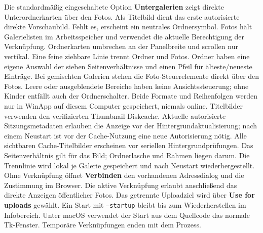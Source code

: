 \documentclass[11pt,a4paper]{article}
\newcommand{\ui}[1]{\textbf{#1}}
\begin{document}
Die standardmäßig eingeschaltete Option \ui{Untergalerien} zeigt direkte
Unterordnerkarten über den Fotos. Als Titelbild dient das erste autorisierte
direkte Vorschaubild. Fehlt es, erscheint ein neutrales Ordnersymbol.
Fotos hält Galerielisten im Arbeitsspeicher und verwendet die aktuelle
Berechtigung der Verknüpfung.
Ordnerkarten umbrechen an der Panelbreite und scrollen nur vertikal. Eine
feine ziehbare Linie trennt Ordner und Fotos. Ordner haben eine eigene Auswahl der
sieben Seitenverhältnisse und einen Pfeil für älteste/neueste Einträge.
Bei gemischten Galerien stehen die Foto-Steuerelemente direkt über den Fotos.
Leere oder ausgeblendete Bereiche haben keine Ansichtssteuerung; ohne Kinder
entfällt auch der Ordnerschalter. Beide Formate und Reihenfolgen werden nur
in WinApp auf diesem Computer gespeichert, niemals online. Titelbilder
verwenden den verifizierten Thumbnail-Diskcache. Aktuelle autorisierte
Sitzungsmetadaten erlauben die Anzeige vor der Hintergrundaktualisierung;
nach einem Neustart ist vor der Cache-Nutzung eine neue Autorisierung nötig.
Alle sichtbaren Cache-Titelbilder erscheinen vor seriellen Hintergrundprüfungen.
Das Seitenverhältnis gilt für das Bild; Ordnerlasche und Rahmen liegen darum.
Die Trennlinie wird lokal je Galerie gespeichert und nach Neustart wiederhergestellt.
Ohne Verknüpfung öffnet \ui{Verbinden} den
vorhandenen Adressdialog und die Zustimmung im Browser. Die aktive
Verknüpfung erlaubt anschließend das direkte Anzeigen öffentlicher Fotos.
Das getrennte Uploadziel wird über \ui{Use for uploads} gewählt.
Ein Start mit \texttt{--startup} bleibt bis zum Wiederherstellen im
Infobereich. Unter macOS verwendet der Start aus dem Quellcode das normale
Tk-Fenster. Temporäre Verknüpfungen enden mit dem Prozess.
\end{document}
